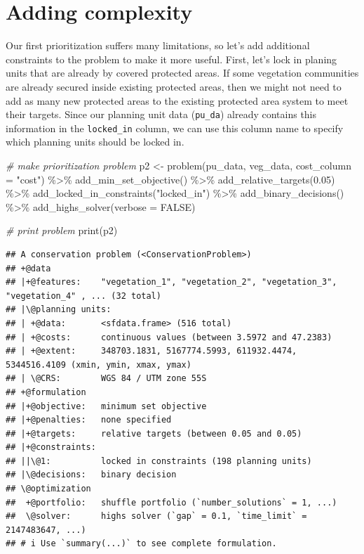 \documentclass[
  12pt,
]{book}
\newenvironment{Shaded}{\begin{snugshade}}{\end{snugshade}}
\newcommand{\AttributeTok}[1]{\textcolor[rgb]{0.77,0.63,0.00}{#1}}
\newcommand{\CommentTok}[1]{\textcolor[rgb]{0.56,0.35,0.01}{\textit{#1}}}
\newcommand{\ConstantTok}[1]{\textcolor[rgb]{0.00,0.00,0.00}{#1}}
\newcommand{\FloatTok}[1]{\textcolor[rgb]{0.00,0.00,0.81}{#1}}
\newcommand{\FunctionTok}[1]{\textcolor[rgb]{0.00,0.00,0.00}{#1}}
\newcommand{\NormalTok}[1]{#1}
\newcommand{\OtherTok}[1]{\textcolor[rgb]{0.56,0.35,0.01}{#1}}
\newcommand{\SpecialCharTok}[1]{\textcolor[rgb]{0.00,0.00,0.00}{#1}}
\newcommand{\StringTok}[1]{\textcolor[rgb]{0.31,0.60,0.02}{#1}}
\begin{document}
\hypertarget{adding-complexity}{%
\section{Adding complexity}\label{adding-complexity}}

Our first prioritization suffers many limitations, so let's add additional constraints to the problem to make it more useful. First, let's lock in planing units that are already by covered protected areas. If some vegetation communities are already secured inside existing protected areas, then we might not need to add as many new protected areas to the existing protected area system to meet their targets. Since our planning unit data (\texttt{pu\_da}) already contains this information in the \texttt{locked\_in} column, we can use this column name to specify which planning units should be locked in.

\begin{Shaded}
\begin{Highlighting}[]
\CommentTok{\# make prioritization problem}
\NormalTok{p2 }\OtherTok{\textless{}{-}} \FunctionTok{problem}\NormalTok{(pu\_data, veg\_data, }\AttributeTok{cost\_column =} \StringTok{"cost"}\NormalTok{) }\SpecialCharTok{\%\textgreater{}\%}
      \FunctionTok{add\_min\_set\_objective}\NormalTok{() }\SpecialCharTok{\%\textgreater{}\%}
      \FunctionTok{add\_relative\_targets}\NormalTok{(}\FloatTok{0.05}\NormalTok{) }\SpecialCharTok{\%\textgreater{}\%}
      \FunctionTok{add\_locked\_in\_constraints}\NormalTok{(}\StringTok{"locked\_in"}\NormalTok{) }\SpecialCharTok{\%\textgreater{}\%}
      \FunctionTok{add\_binary\_decisions}\NormalTok{() }\SpecialCharTok{\%\textgreater{}\%}
      \FunctionTok{add\_highs\_solver}\NormalTok{(}\AttributeTok{verbose =} \ConstantTok{FALSE}\NormalTok{)}

\CommentTok{\# print problem}
\FunctionTok{print}\NormalTok{(p2)}
\end{Highlighting}
\end{Shaded}

\begin{verbatim}
## A conservation problem (<ConservationProblem>)
## +@data
## |+@features:    "vegetation_1", "vegetation_2", "vegetation_3", "vegetation_4" , ... (32 total)
## |\@planning units:
## | +@data:       <sfdata.frame> (516 total)
## | +@costs:      continuous values (between 3.5972 and 47.2383)
## | +@extent:     348703.1831, 5167774.5993, 611932.4474, 5344516.4109 (xmin, ymin, xmax, ymax)
## | \@CRS:        WGS 84 / UTM zone 55S
## +@formulation
## |+@objective:   minimum set objective
## |+@penalties:   none specified
## |+@targets:     relative targets (between 0.05 and 0.05)
## |+@constraints:
## ||\@1:          locked in constraints (198 planning units)
## |\@decisions:   binary decision
## \@optimization
##  +@portfolio:   shuffle portfolio (`number_solutions` = 1, ...)
##  \@solver:      highs solver (`gap` = 0.1, `time_limit` = 2147483647, ...)
## # i Use `summary(...)` to see complete formulation.
\end{verbatim}
\end{document}
